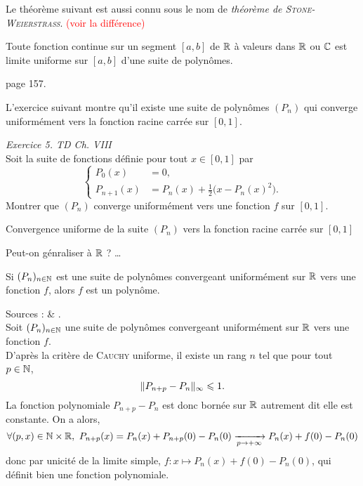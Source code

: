 Le théorème suivant est aussi connu sous le nom  de \emph{théorème de \textsc{Stone-Weierstrass}}. \textcolor{red}{(voir la différence)}

\begin{theo}
    Toute fonction continue sur un segment $[a, b]$ de $\mathbb{R}$ à valeurs dans $\mathbb{R}$ ou $\mathbb{C}$ est limite uniforme sur $[a, b]$ d'une suite de polynômes.
\end{theo}

\begin{preuve}
    \cite{calcul_infinitesimal} page 157.
\end{preuve} 

L'exercice suivant montre qu'il existe une suite de polynômes $(P_n)$ qui converge uniformément vers la fonction racine carrée sur $[0, 1]$.

\begin{exercice}
    \emph{Exercice 5. TD Ch. VIII}\\
    Soit la suite de fonctions définie pour tout $x \in [0, 1]$ par
    $$
    \begin{cases}
        P_0(x) &= 0,\\
        P_{n+1}(x) &= P_n (x) + \frac{1}{2} \big( x-P_n (x)^2 \big).
    \end{cases}
    $$
    Montrer que $(P_n)$ converge uniformément vers une fonction $f$ sur $[0, 1]$.
\end{exercice}

\begin{marginfigure}[-5cm]
    \centering
	
	\caption{\centering Convergence uniforme de la suite $(P_n)$ vers la fonction racine carrée sur $[0,1]$}
\end{marginfigure}

Peut-on génraliser à $\mathbb{R}$ ? \dots

\begin{prop}
    Si $(P_n)_{n \in \mathbb{N}}$ est une suite de polynômes convergeant uniformément sur $\mathbb{R}$ vers une fonction $f$, alors $f$ est un polynôme.
\end{prop}

\begin{preuve}
    Sources : \cite{exos_oraux} \& \cite{maths-france}. \\
    Soit $(P_n)_{n \in \mathbb{N}}$ une suite de polynômes convergeant uniformément sur $\mathbb{R}$ vers une fonction $f$. \\
    D'après la critère de \textsc{Cauchy} uniforme, il existe un rang $n$ tel que pour tout $p \in \mathbb{N}$, 
    $$\Vert P_{n+p} - P_n \Vert_\infty \leqslant 1.$$
    La fonction polynomiale $P_{n+p} - P_n$ est donc bornée sur $\mathbb{R}$ autrement dit elle est constante. On a alors,
    $$\forall (p, x) \in \mathbb{N} \times \mathbb{R},\ P_{n+p}(x) = P_n(x) + P_{n+p}(0) - P_n(0) \xrightarrow[p \to + \infty]{} P_n(x) + f(0) - P_n(0)$$
    donc par unicité de la limite simple, $f : x \mapsto P_n(x) + f(0) - P_n(0)$, qui définit bien une fonction polynomiale. 
\end{preuve}
